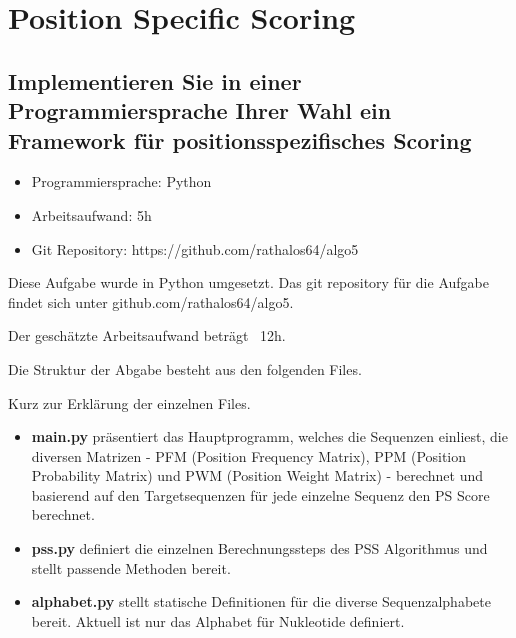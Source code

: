 \section{Position Specific Scoring}
\subsection*{Implementieren Sie in einer Programmiersprache Ihrer Wahl ein Framework für positionsspezifisches Scoring}

\begin{itemize}
	\item Programmiersprache: Python
	\item Arbeitsaufwand: 5h
	\item Git Repository: https://github.com/rathalos64/algo5
\end{itemize}
Diese Aufgabe wurde in Python umgesetzt.
Das git repository für die Aufgabe findet sich unter github.com/rathalos64/algo5.

Der geschätzte Arbeitsaufwand beträgt ~12h.

\bigskip\noindent
Die Struktur der Abgabe besteht aus den folgenden Files.
\newline
{}

\bigskip
Kurz zur Erklärung der einzelnen Files.
\begin{itemize}
	\item \textbf{main.py} präsentiert das Hauptprogramm, welches die Sequenzen einliest, die diversen Matrizen -
	PFM (Position Frequency Matrix), PPM (Position Probability Matrix) und PWM (Position Weight Matrix) - berechnet und
	basierend auf den Targetsequenzen für jede einzelne Sequenz den PS Score berechnet.
	\item \textbf{pss.py} definiert die einzelnen Berechnungssteps des PSS Algorithmus und stellt passende Methoden bereit.
	\item \textbf{alphabet.py} stellt statische Definitionen für die diverse Sequenzalphabete bereit. Aktuell ist nur das 
	Alphabet für Nukleotide definiert.
\end{itemize}


